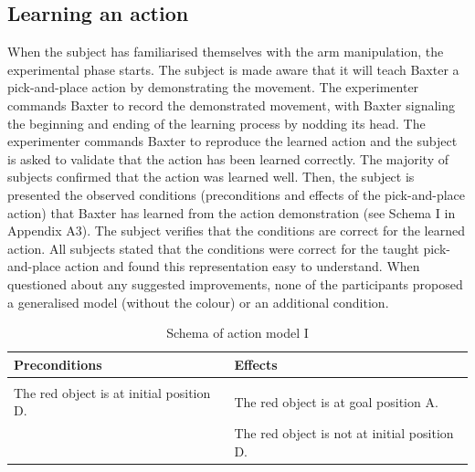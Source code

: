 \subsection{Learning an action}
When the subject has familiarised themselves with the arm manipulation, the experimental phase starts. The subject is made aware that it will teach Baxter a pick-and-place action by demonstrating the movement. The experimenter commands Baxter to record the demonstrated movement, with Baxter signaling the beginning and ending of the learning process by nodding its head. The experimenter commands Baxter to reproduce the learned action and the subject is asked to validate that the action has been learned correctly. The majority of subjects confirmed that the action was learned well. Then, the subject is presented the observed conditions (preconditions and effects of the pick-and-place action) that Baxter has learned from the action demonstration (see Schema I in Appendix A3).
The subject verifies that the conditions are correct for the learned action. All subjects stated that the conditions were correct for the taught pick-and-place action and found this representation easy to understand. When questioned about any suggested improvements, none of the participants proposed a generalised model (without the colour) or an additional condition.

\begin{table}[h]
\begin{center}
\begin{tabular}{l|l}
Preconditions & Effects\\ \hline
 & \\
The red object is at initial position D. & The red object is at goal position A.\\
 & The red object is not at initial position D.
\end{tabular}
\end{center}
\label{tab:schema1}
\caption{Schema of action model I}
\end{table}

